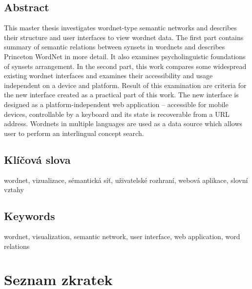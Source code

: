 \documentclass[a4paper,11pt,openany,twoside]{book}
\begin{document}
\section*{Abstract}

This master thesis investigates wordnet-type semantic networks and describes their structure and user interfaces to view wordnet data. The first part contains summary of semantic relations between synsets in wordnets and describes Princeton WordNet in more detail. It also examines psycholinguistic foundations of synsets arrangement. In the second part, this work compares some widespread existing wordnet interfaces and examines their accessibility and usage independent on a device and platform. Result of this examination are criteria for the new interface created as a practical part of this work. The new interface is designed as a platform-independent web application -- accessible for mobile devices, controllable by a keyboard and its state is recoverable from a URL address. Wordnets in multiple languages are used as a data source which allows user to perform an interlingual concept search.

\section*{Klíčová slova}

wordnet, vizualizace, sémantická síť, uživatelské rozhraní, webová aplikace, slovní vztahy

\section*{Keywords}

wordnet, visualization, semantic network, user interface, web application, word relations

\clearpage



	{
		\tableofcontents

		\adjustmtc %
		\adjustmtc %
	}


		\chapter*{Seznam zkratek}
		\label{cha:seznamzkratek}
\end{document}
